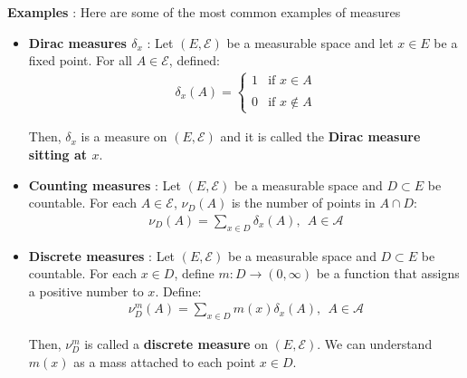\noindent\newline \textbf{Examples} : Here are some of the most common examples of measures
\begin{itemize}
    \item \textbf{Dirac measures $\delta_x$} : Let $(E, \mathcal{E})$ be a measurable space and let $x\in E$ be a fixed point. For all $A\in\mathcal{E}$, defined:
    \begin{align*}
        \delta_x(A) = \begin{cases}
            1 &\text{if } x \in A 
            \\ \\
            0 &\text{if } x \notin A
        \end{cases}
    \end{align*}

    \noindent Then, $\delta_x$ is a measure on $(E, \mathcal{E})$ and it is called the \textbf{Dirac measure sitting at $x$}.

    \item \textbf{Counting measures} : Let $(E, \mathcal{E})$ be a measurable space and $D\subset E$ be countable. For each $A\in\mathcal{E}$, $\nu_D(A)$ is the number of points in $A\cap D$:
    \begin{align*}
        \nu_D(A) = \sum_{x\in D}\delta_x(A), \ \ A \in \mathcal{A}
    \end{align*}

    \item \textbf{Discrete measures} : Let $(E, \mathcal{E})$ be a measurable space and $D\subset E$ be countable. For each $x\in D$, define $m:D\to (0, \infty)$ be a function that assigns a positive number to $x$. Define:
    \begin{align*}
        \nu_D^m (A) = \sum_{x\in D}m(x)\delta_x(A), \ \ A \in \mathcal{A}
    \end{align*}

    \noindent Then, $\nu_D^m$ is called a \textbf{discrete measure} on $(E, \mathcal{E})$. We can understand $m(x)$ as a mass attached to each point $x\in D$.
\end{itemize}

